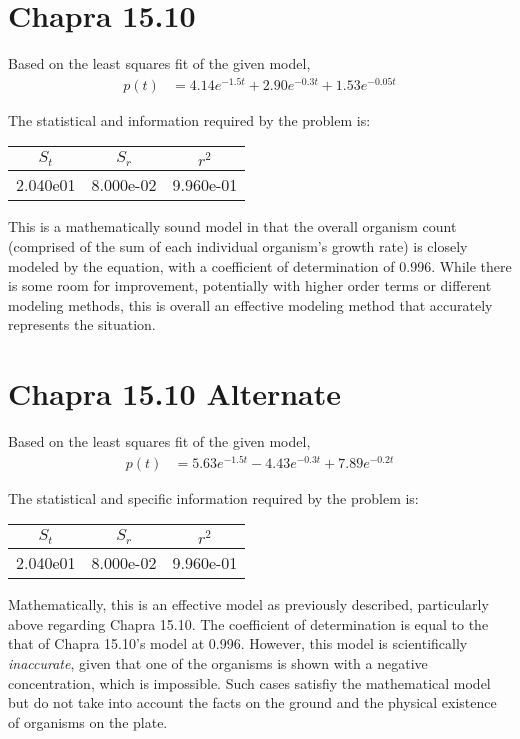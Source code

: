 \documentclass{article}
\begin{document}
\section{Chapra 15.10}
Based on the least squares fit of the given model,
\begin{align*}
p(t)&=4.14e^{-1.5t} + 2.90e^{-0.3t} + 1.53e^{-0.05t}
\end{align*}

The statistical and information required by the problem is:
\begin{center}
\begin{tabular}{c|c|c}
$S_t$ & $S_r$ & $r^2$\\ \hline
 2.040e01 &8.000e-02 & 9.960e-01 \\
\end{tabular}
\end{center}
This is a mathematically sound model in that the overall organism count (comprised of the sum of each individual organism's growth rate) is closely modeled by the equation, with a coefficient of determination of 0.996. While there is some room for improvement, potentially with higher order terms or different modeling methods, this is overall an effective modeling method that accurately represents the situation. 

\section{Chapra 15.10 Alternate}
Based on the least squares fit of the given model,
\begin{align*}%
p(t)&=5.63e^{-1.5t} - 4.43e^{-0.3t} + 7.89e^{-0.2t}
\end{align*}

The statistical and specific information required by the problem is:
\begin{center}
\begin{tabular}{c|c|c}
$S_t$ & $S_r$ & $r^2$\\ \hline
2.040e01 & 8.000e-02 & 9.960e-01\\
\end{tabular}
\end{center}
Mathematically, this is an effective model as previously described, particularly above regarding Chapra 15.10. The coefficient of determination is equal to the that of Chapra 15.10's model at 0.996. However, this model is scientifically \textit{inaccurate}, given that one of the organisms is shown with a negative concentration, which is impossible. Such cases satisfiy the mathematical model but do not take into account the facts on the ground and the physical existence of organisms on the plate.
\end{document}
